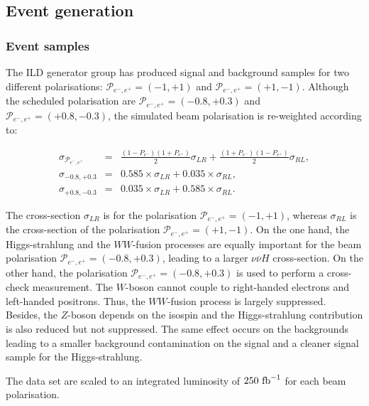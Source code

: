   \subsection{Event generation}
     
     \subsubsection{Event samples}

     The \gls{ILD} generator group has produced signal and background samples for two different polarisations:  $\mathcal{P}_{e^-,e^+} = (-1,+1)$ and $\mathcal{P}_{e^-,e^+} = (+1,-1)$.
     Although the scheduled polarisation are $\mathcal{P}_{e^-,e^+} = (-0.8,+0.3)$ and  $\mathcal{P}_{e^-,e^+} = (+0.8,-0.3)$, the simulated beam polarisation is re-weighted according to:
     
     \begin{equation}
       \begin{array}{lrc}
       \sigma_{\mathcal{P}_{e^-,e^+}} & = & \frac{(1 - P_{e^-})(1+P_{e^+})}{2} \sigma_{LR} + \frac{(1+P_{e^-})(1-P_{e^+})}{2} \sigma_{RL}, \\
       \sigma_{-0.8,+0.3} & = & 0.585 \times \sigma_{LR} + 0.035 \times \sigma_{RL}, \\
       \sigma_{+0.8,-0.3} & = & 0.035 \times \sigma_{LR} + 0.585 \times \sigma_{RL}.
       \end{array}
     \end{equation}

     The cross-section $\sigma_{LR}$ is for the polarisation $\mathcal{P}_{e^-,e^+} = (-1,+1)$, whereas $\sigma_{RL}$ is the cross-section of the polarisation $\mathcal{P}_{e^-,e^+} = (+1,-1)$.
     On the one hand, the Higgs-strahlung and the $WW$-fusion processes are equally important for the beam polarisation  $\mathcal{P}_{e^-,e^+} = (-0.8,+0.3)$, leading to a larger $\nu\overline{\nu} H$ cross-section.
     On the other hand, the polarisation $\mathcal{P}_{e^-,e^+} = (-0.8,+0.3)$ is used to perform a cross-check measurement.
     The $W$-boson cannot couple to right-handed electrons and left-handed positrons.
     Thus, the $WW$-fusion process is largely suppressed.
     Besides, the $Z$-boson depends on the isospin and the Higgs-strahlung contribution is also reduced but not suppressed.
     The same effect occurs on the backgrounds leading to a smaller background contamination on the signal and a cleaner signal sample for the Higgs-strahlung.

     The data set are scaled to an integrated luminosity of $250~\rm{fb}^{-1}$ for each beam polarisation.

